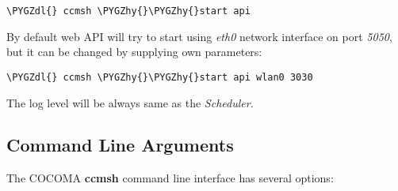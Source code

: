 \documentclass[letterpaper,10pt,english]{sphinxmanual}
\def\PYGZdl{\char`\$}
\def\PYGZhy{\char`\-}
\begin{document}
\begin{Verbatim}[commandchars=\\\{\}]
\PYGZdl{} ccmsh \PYGZhy{}\PYGZhy{}start api
\end{Verbatim}

By default web API will try to start using \emph{eth0} network interface on port \emph{5050}, but it can be changed by supplying own parameters:

\begin{Verbatim}[commandchars=\\\{\}]
\PYGZdl{} ccmsh \PYGZhy{}\PYGZhy{}start api wlan0 3030
\end{Verbatim}

The log level will be always same as the \emph{Scheduler}.


\subsection{Command Line Arguments}
\label{01_how_to_use_it:command-line-arguments}
The COCOMA \textbf{ccmsh} command line interface has several options:

\begin{fulllineitems}
\label{01_how_to_use_it:cmdoption-ccmsh-h}
\end{fulllineitems}


\begin{fulllineitems}
\label{01_how_to_use_it:cmdoption-ccmsh-v}
\end{fulllineitems}


\begin{fulllineitems}
\label{01_how_to_use_it:cmdoption-ccmsh-l}
\end{fulllineitems}
\end{document}
